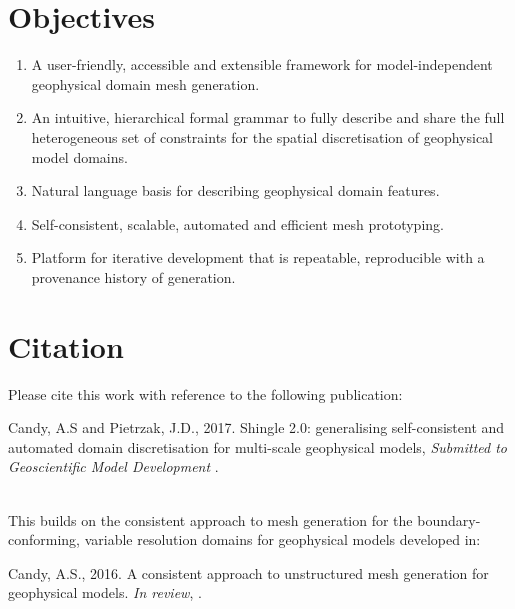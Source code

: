 \documentclass[a4paper, 10pt]{book}
\providecommand{\dotbrml}{\texttt{.brml}\xspace}
\begin{document}
\section{Objectives}
\begin{enumerate}
\setlength{\itemsep}{1pt}\setlength{\parskip}{0pt}\setlength{\parsep}{0pt}
\item A user-friendly, accessible and extensible framework for model-independent geophysical domain mesh generation.
\item An intuitive, hierarchical formal grammar to fully describe and share the full heterogeneous set of constraints for the spatial discretisation of geophysical model domains.
\item Natural language basis for describing geophysical domain features.
\item Self-consistent, scalable, automated and efficient mesh prototyping.
\item Platform for iterative development that is repeatable, reproducible with a provenance history of generation.
\end{enumerate}

\clearpage
\section{Citation}
\label{sec:citations}
Please cite this work with reference to the following publication:
\par\vskip 4pt\noindent\hspace{0.02\columnwidth}%
\begin{minipage}{0.9\columnwidth}%
Candy, A.S and Pietrzak, J.D., 2017. Shingle 2.0: generalising self-consistent and automated domain discretisation for multi-scale geophysical models, \emph{Submitted to Geoscientific Model Development} \citep{candyshingle}.
\end{minipage}
\\

\medskip
\noindent
This builds on the consistent approach to mesh generation for the boundary-conforming, variable resolution domains for  geophysical models developed in:
\par\vskip 4pt\noindent\hspace{0.02\columnwidth}%
\begin{minipage}{0.9\columnwidth}%
Candy, A.S., 2016. A consistent approach to unstructured mesh generation for geophysical models. \emph{In review}, \citep{candybrep}.
\end{minipage}
\\
\end{document}
